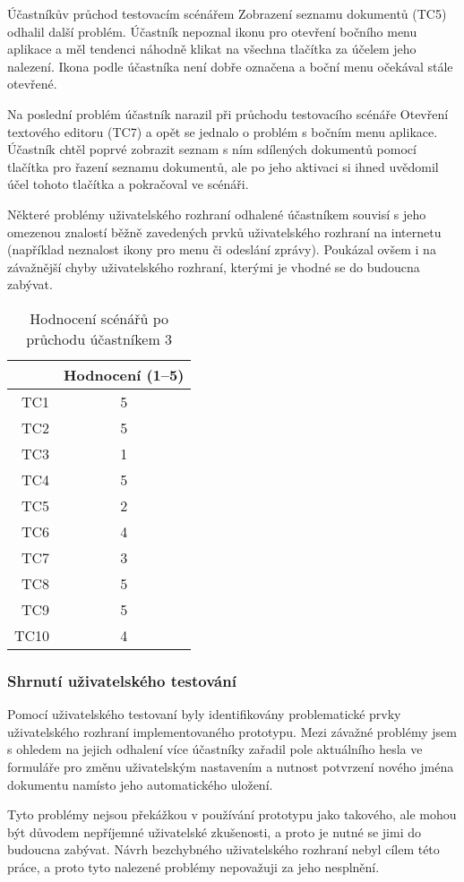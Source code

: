 Účastníkův průchod testovacím scénářem Zobrazení seznamu dokumentů (TC5) odhalil další problém.
Účastník nepoznal ikonu pro otevření bočního menu aplikace a měl tendenci náhodně klikat na všechna tlačítka za účelem jeho nalezení.
Ikona podle účastníka není dobře označena a boční menu očekával stále otevřené.

Na poslední problém účastník narazil při průchodu testovacího scénáře Otevření textového editoru (TC7) a opět se jednalo o problém s bočním menu aplikace.
Účastník chtěl poprvé zobrazit seznam s ním sdílených dokumentů pomocí tlačítka pro řazení seznamu dokumentů, ale po jeho aktivaci si ihned uvědomil účel tohoto tlačítka a pokračoval ve scénáři.

Některé problémy uživatelského rozhraní odhalené účastníkem souvisí s jeho omezenou znalostí běžně zavedených prvků uživatelského rozhraní na internetu (například neznalost ikony pro menu či odeslání zprávy).
Poukázal ovšem i na závažnější chyby uživatelského rozhraní, kterými je vhodné se do budoucna zabývat.

\begin{table}[ht!]
    \centering
    \caption{Hodnocení scénářů po průchodu účastníkem 3}
    \label{tab:poPrůchoduÚčastníkem3}
    \begin{tabular}{r|c}
        & Hodnocení (1--5) \\ \hline
        TC1 & 5 \\
        TC2 & 5 \\
        TC3 & 1 \\
        TC4 & 5 \\
        TC5 & 2 \\
        TC6 & 4 \\
        TC7 & 3 \\
        TC8 & 5 \\
        TC9 & 5 \\
        TC10 & 4 \\
    \end{tabular}
\end{table}

\subsubsection{Shrnutí uživatelského testování}

Pomocí uživatelského testovaní byly identifikovány problematické prvky uživatelského rozhraní implementovaného prototypu.
Mezi závažné problémy jsem s ohledem na jejich odhalení více účastníky zařadil pole aktuálního hesla ve formuláře pro změnu uživatelským nastavením a nutnost potvrzení nového jména dokumentu namísto jeho automatického uložení.

Tyto problémy nejsou překážkou v používání prototypu jako takového, ale mohou být důvodem nepříjemné uživatelské zkušenosti, a proto je nutné se jimi do budoucna zabývat.
Návrh bezchybného uživatelského rozhraní nebyl cílem této práce, a proto tyto nalezené problémy nepovažuji za jeho nesplnění.
